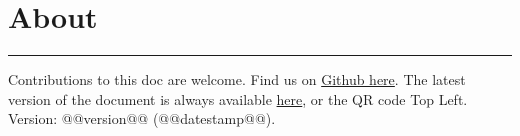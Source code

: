 \section{About}
\hrule

\medskip

Contributions to this doc are welcome. Find us on \href{https://github.com/robert-will-brown/video-streaming-cheatsheet}{Github here}.
The latest version of the document is always available \href{https://bit.ly/3p1Omqh}{here}, or the QR code Top Left.
~\\

Version: @@version@@ (@@datestamp@@).
